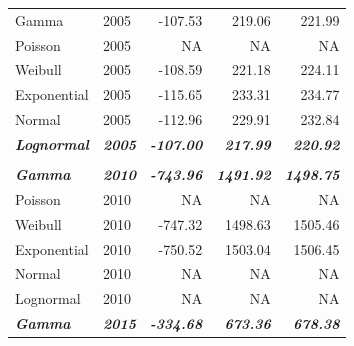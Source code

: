 \documentclass[
11pt, %
oneside, %
english, %
singlespacing, %
]{macthesis} %
\begin{document}
\begin{table}
\begin{tabular}{llrrr}
\hspace{1em}Gamma & 2005 & -107.53 & 219.06 & 221.99\\
\hspace{1em}Poisson & 2005 & NA & NA & NA\\
\hspace{1em}Weibull & 2005 & -108.59 & 221.18 & 224.11\\
\hspace{1em}Exponential & 2005 & -115.65 & 233.31 & 234.77\\
\hspace{1em}Normal & 2005 & -112.96 & 229.91 & 232.84\\
\begingroup\fontsize{10}{12}\selectfont \em{\textbf{\hspace{1em}Lognormal}}\endgroup & \begingroup\fontsize{10}{12}\selectfont \em{\textbf{2005}}\endgroup & \begingroup\fontsize{10}{12}\selectfont \em{\textbf{-107.00}}\endgroup & \begingroup\fontsize{10}{12}\selectfont \em{\textbf{217.99}}\endgroup & \begingroup\fontsize{10}{12}\selectfont \em{\textbf{220.92}}\endgroup\\
\addlinespace[0.3em]
\multicolumn{5}{l}{\textbf{Destination: Library}}\\
\begingroup\fontsize{10}{12}\selectfont \em{\textbf{\hspace{1em}Gamma}}\endgroup & \begingroup\fontsize{10}{12}\selectfont \em{\textbf{2010}}\endgroup & \begingroup\fontsize{10}{12}\selectfont \em{\textbf{-743.96}}\endgroup & \begingroup\fontsize{10}{12}\selectfont \em{\textbf{1491.92}}\endgroup & \begingroup\fontsize{10}{12}\selectfont \em{\textbf{1498.75}}\endgroup\\
\hspace{1em}Poisson & 2010 & NA & NA & NA\\
\hspace{1em}Weibull & 2010 & -747.32 & 1498.63 & 1505.46\\
\hspace{1em}Exponential & 2010 & -750.52 & 1503.04 & 1506.45\\
\hspace{1em}Normal & 2010 & NA & NA & NA\\
\hspace{1em}Lognormal & 2010 & NA & NA & NA\\
\begingroup\fontsize{10}{12}\selectfont \em{\textbf{\hspace{1em}Gamma}}\endgroup & \begingroup\fontsize{10}{12}\selectfont \em{\textbf{2015}}\endgroup & \begingroup\fontsize{10}{12}\selectfont \em{\textbf{-334.68}}\endgroup & \begingroup\fontsize{10}{12}\selectfont \em{\textbf{673.36}}\endgroup & \begingroup\fontsize{10}{12}\selectfont \em{\textbf{678.38}}\endgroup\\

\end{tabular}
\end{table}
\end{document}
